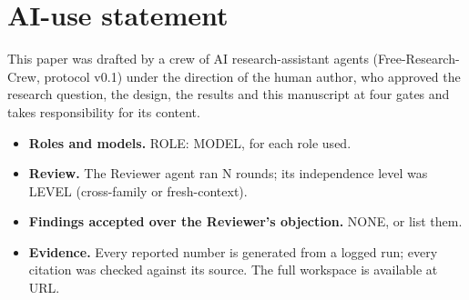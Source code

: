 \section*{AI-use statement}

This paper was drafted by a crew of AI research-assistant agents
(Free-Research-Crew, protocol v0.1) under the direction of the human author, who approved
the research question, the design, the results and this manuscript at four gates and
takes responsibility for its content.

\begin{itemize}
  \item \textbf{Roles and models.} ROLE: MODEL, for each role used.
  \item \textbf{Review.} The Reviewer agent ran N rounds; its independence level was
        LEVEL (cross-family or fresh-context).
  \item \textbf{Findings accepted over the Reviewer's objection.} NONE, or list them.
  \item \textbf{Evidence.} Every reported number is generated from a logged run; every
        citation was checked against its source. The full workspace is available at URL.
\end{itemize}
